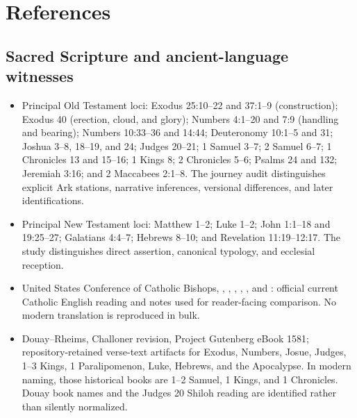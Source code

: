 \section{References}
\mbox{}\par\vspace{0.6\baselineskip}

\begingroup
\footnotesize
\setlength{\parskip}{0.25em}

\subsection{Sacred Scripture and ancient-language witnesses}

\begin{itemize}
  \item Principal Old Testament loci: Exodus 25:10--22 and 37:1--9 (construction); Exodus 40 (erection, cloud, and glory); Numbers 4:1--20 and 7:9 (handling and bearing); Numbers 10:33--36 and 14:44; Deuteronomy 10:1--5 and 31; Joshua 3--8, 18--19, and 24; Judges 20--21; 1 Samuel 3--7; 2 Samuel 6--7; 1 Chronicles 13 and 15--16; 1 Kings 8; 2 Chronicles 5--6; Psalms 24 and 132; Jeremiah 3:16; and 2 Maccabees 2:1--8.  The journey audit distinguishes explicit Ark stations, narrative inferences, versional differences, and later identifications.
  \item Principal New Testament loci: Matthew 1--2; Luke 1--2; John 1:1--18 and 19:25--27; Galatians 4:4--7; Hebrews 8--10; and Revelation 11:19--12:17.  The study distinguishes direct assertion, canonical typology, and ecclesial reception.
  \item United States Conference of Catholic Bishops, , , , , , and : official current Catholic English reading and notes used for reader-facing comparison.  No modern translation is reproduced in bulk.
  \item Douay--Rheims, Challoner revision, Project Gutenberg eBook 1581; repository-retained verse-text artifacts for Exodus, Numbers, Josue, Judges, 1--3 Kings, 1 Paralipomenon, Luke, Hebrews, and the Apocalypse.  In modern naming, those historical books are 1--2 Samuel, 1 Kings, and 1 Chronicles.  Douay book names and the Judges 20 Shiloh reading are identified rather than silently normalized.

\end{itemize}
